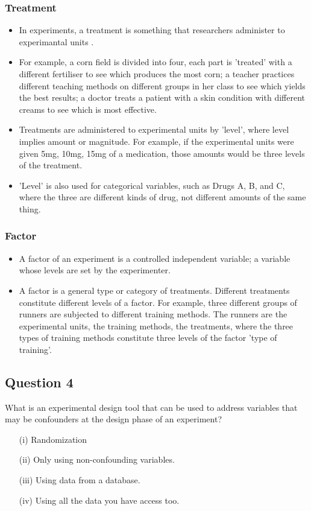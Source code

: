 \documentclass[12pt]{article}
\begin{document}
\subsubsection*{Treatment}
\begin{itemize}
\item In experiments, a treatment is something that researchers administer to experimantal units . 
\item For example, a corn field is divided into four, each part is 'treated' with a different fertiliser to see which produces the most corn; a teacher practices different teaching methods on different groups in her class to see which yields the best results; a doctor treats a patient with a skin condition with different creams to see which is most effective.
\item Treatments are administered to experimental units by 'level', where level implies amount or magnitude. For example, if the experimental units were given 5mg, 10mg, 15mg of a medication, those amounts would be three levels of the treatment. 
\item 'Level' is also used for categorical variables, such as Drugs A, B, and C, where the three are different kinds of drug, not different amounts of the same thing.
\end{itemize}
\subsubsection*{Factor}
\begin{itemize}
\item A factor of an experiment is a controlled independent variable; a variable whose levels are set by the experimenter.
\item A factor is a general type or category of treatments. Different treatments constitute different levels of a factor. For example, three different groups of runners are subjected to different training methods. The runners are the experimental units, the training methods, the treatments, where the three types of training methods constitute three levels of the factor 'type of training'.

\end{itemize}


\newpage
\subsection*{Question 4}
What is an experimental design tool that can be used to address variables that may be confounders at the design phase of an experiment?
\begin{itemize}
\item[(i)] Randomization
\item[(ii)] Only using non-confounding variables.
\item[(iii)] Using data from a database.
\item[(iv)] Using all the data you have access too.
\end{itemize}
\newpage
\end{document}
